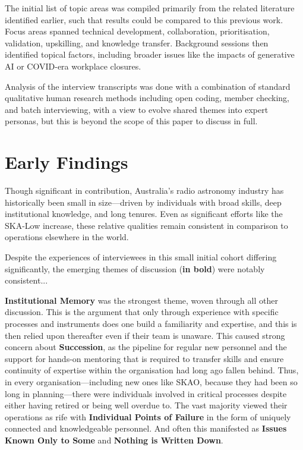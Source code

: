 \documentclass[11pt,twoside]{article}
\begin{document}
The initial list of topic areas was compiled primarily from the related literature identified earlier, such that results could be compared to this previous work. Focus areas spanned technical development, collaboration, prioritisation, validation, upskilling, and knowledge transfer. Background sessions then identified topical factors, including broader issues like the impacts of generative AI or COVID-era workplace closures.

Analysis of the interview transcripts was done with a combination of standard qualitative human research methods including open coding, member checking, and batch interviewing, with a view to evolve shared themes into expert personas, but this is beyond the scope of this paper to discuss in full.

\section{Early Findings}

Though significant in contribution, Australia's radio astronomy industry has historically been small in size---driven by individuals with broad skills, deep institutional knowledge, and long tenures. Even as significant efforts like the SKA-Low increase, these relative qualities remain consistent in comparison to operations elsewhere in the world. 

Despite the experiences of interviewees in this small initial cohort differing significantly, the emerging themes of discussion (\textbf{in bold}) were notably consistent...

\textbf{Institutional Memory} was the strongest theme, woven through all other discussion. This is the argument that only through experience with specific processes and instruments does one build a familiarity and expertise, and this is then relied upon thereafter even if their team is unaware. This caused strong concern about \textbf{Succession}, as the pipeline for regular new personnel and the support for hands-on mentoring that is required to transfer skills and ensure continuity of expertise within the organisation had long ago fallen behind. Thus, in every organisation---including new ones like SKAO, because they had been so long in planning---there were individuals involved in critical processes despite either having retired or being well overdue to. The vast majority viewed their operations as rife with \textbf{Individual Points of Failure} in the form of uniquely connected and knowledgeable personnel. And often this manifested as \textbf{Issues Known Only to Some} and \textbf{Nothing is Written Down}.
\end{document}
